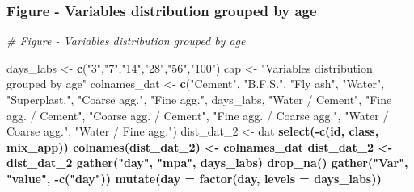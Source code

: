 \documentclass[
]{article}
\newenvironment{Shaded}{\begin{snugshade}}{\end{snugshade}}
\newcommand{\CommentTok}[1]{\textcolor[rgb]{0.56,0.35,0.01}{\textit{#1}}}
\newcommand{\DataTypeTok}[1]{\textcolor[rgb]{0.13,0.29,0.53}{#1}}
\newcommand{\DecValTok}[1]{\textcolor[rgb]{0.00,0.00,0.81}{#1}}
\newcommand{\KeywordTok}[1]{\textcolor[rgb]{0.13,0.29,0.53}{\textbf{#1}}}
\newcommand{\NormalTok}[1]{#1}
\newcommand{\OperatorTok}[1]{\textcolor[rgb]{0.81,0.36,0.00}{\textbf{#1}}}
\newcommand{\StringTok}[1]{\textcolor[rgb]{0.31,0.60,0.02}{#1}}
\begin{document}
\hypertarget{figure---variables-distribution-grouped-by-age}{%
\subsubsection{Figure - Variables distribution grouped by
age}\label{figure---variables-distribution-grouped-by-age}}

\label{show-vars-distribution-time}

\begin{Shaded}
\begin{Highlighting}[]
\CommentTok{# Figure - Variables distribution grouped by age}
  
\NormalTok{days_labs <-}\StringTok{ }\KeywordTok{c}\NormalTok{(}\StringTok{"3"}\NormalTok{,}\StringTok{"7"}\NormalTok{,}\StringTok{"14"}\NormalTok{,}\StringTok{"28"}\NormalTok{,}\StringTok{"56"}\NormalTok{,}\StringTok{"100"}\NormalTok{)}
\NormalTok{cap <-}\StringTok{ "Variables distribution grouped by age"}
\NormalTok{colnames_dat <-}\StringTok{ }\KeywordTok{c}\NormalTok{(}\StringTok{"Cement"}\NormalTok{, }\StringTok{"B.F.S."}\NormalTok{, }\StringTok{"Fly ash"}\NormalTok{, }\StringTok{"Water"}\NormalTok{,}
                  \StringTok{"Superplast."}\NormalTok{, }\StringTok{"Coarse agg."}\NormalTok{, }\StringTok{"Fine agg."}\NormalTok{,}
\NormalTok{                  days_labs,}
                  \StringTok{"Water / Cement"}\NormalTok{, }\StringTok{"Fine agg. / Cement"}\NormalTok{, }
                  \StringTok{"Coarse agg. / Cement"}\NormalTok{, }\StringTok{"Fine agg. / Coarse agg."}\NormalTok{,}
                  \StringTok{"Water / Coarse agg."}\NormalTok{, }\StringTok{"Water / Fine agg."}\NormalTok{)}
\NormalTok{dist_dat_}\DecValTok{2}\NormalTok{ <-}\StringTok{ }\NormalTok{dat }\OperatorTok{%
\StringTok{  }\KeywordTok{select}\NormalTok{(}\OperatorTok{-}\KeywordTok{c}\NormalTok{(id, class, mix_app))}
\KeywordTok{colnames}\NormalTok{(dist_dat_}\DecValTok{2}\NormalTok{) <-}\StringTok{ }\NormalTok{colnames_dat}
\NormalTok{dist_dat_}\DecValTok{2}\NormalTok{ <-}\StringTok{ }\NormalTok{dist_dat_}\DecValTok{2} \OperatorTok{%
\StringTok{  }\KeywordTok{gather}\NormalTok{(}\StringTok{"day"}\NormalTok{, }\StringTok{"mpa"}\NormalTok{, days_labs) }\OperatorTok{%
\StringTok{  }\KeywordTok{drop_na}\NormalTok{() }\OperatorTok{%
\StringTok{  }\KeywordTok{gather}\NormalTok{(}\StringTok{"Var"}\NormalTok{, }\StringTok{"value"}\NormalTok{, }\OperatorTok{-}\KeywordTok{c}\NormalTok{(}\StringTok{"day"}\NormalTok{)) }\OperatorTok{%
\StringTok{  }\KeywordTok{mutate}\NormalTok{(}\DataTypeTok{day =} \KeywordTok{factor}\NormalTok{(day, }\DataTypeTok{levels =}\NormalTok{ days_labs))}
}}}}}
\end{Highlighting}
\end{Shaded}
\end{document}
